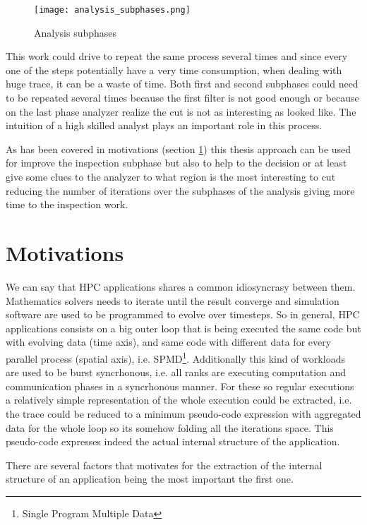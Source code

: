 \begin{figure}[]
  \centering
  \texttt{[image: analysis\_subphases.png]}
  \caption{Analysis subphases}
  \label{fig:analysis_subphases}
\end{figure}

This work could drive to repeat the same process several times and since every 
one of the steps potentially have a very time consumption, when dealing with
huge trace, it can be a waste of time. 
Both first and second subphases could need to be repeated several times because 
the first filter is not good enough or because on the last phase analyzer realize 
the cut is not as interesting as looked like. The intuition of a high skilled
analyst plays an important role in this process.

As has been covered in motivations (section \ref{s:motivations}) this thesis
approach can be used for improve the inspection subphase but also to help to the
decision or at least give some clues to the analyzer to what region is the most
interesting to cut reducing the number of iterations over the subphases of the
analysis giving more time to the inspection work.

\section{Motivations}\label{s:motivations}

We can say that HPC applications shares a common idiosyncrasy between them. 
Mathematics solvers needs to iterate until the result converge and 
simulation software are used to be programmed to evolve over timesteps. So in 
general, HPC applications consists on a big outer loop that is being executed the 
same code but with evolving data (time axis), and same code with different data
for every parallel process (spatial axis), i.e. SPMD\footnote{Single
Program Multiple Data}. Additionally this kind of workloads are used
to be burst syncrhonous, i.e. all ranks are executing computation and
communication phases in a syncrhonous manner. For these so regular executions a
relatively simple representation of the whole execution could be extracted, i.e.
the trace could be reduced to a minimum pseudo-code expression
with aggregated data for the whole loop so its somehow folding all the iterations
space. This pseudo-code expresses indeed the actual internal structure of the 
application.

There are several factors that motivates for the extraction of the internal
structure of an application being the most important the first one.


